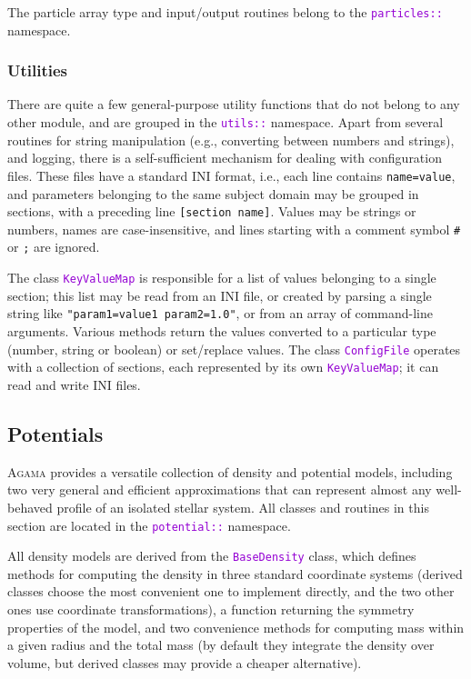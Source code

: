 \documentclass[12pt]{article}
\newcommand{\Agama}{\textsc{Agama}\xspace}
\newcommand{\ttt}[1]{\textcolor{darkviolet}{\texttt{#1}}}
\newcommand{\ppp}[1]{\textcolor{darkolive} {\texttt{#1}}}
\begin{document}
The particle array type and input/output routines belong to the \ttt{particles::} name\-space.

\subsubsection{Utilities}  \label{sec:Utilities}

There are quite a few general-purpose utility functions that do not belong to any other module, and are grouped in the \ttt{utils::} namespace. 
Apart from several routines for string manipulation (e.g., converting between numbers and strings), and logging, there is a self-sufficient mechanism for dealing with configuration files. These files have a standard INI format, i.e., each line contains \ppp{name=value}, and parameters belonging to the same subject domain may be grouped in sections, with a preceding line \ppp{[section name]}. Values may be strings or numbers, names are case-insensitive, and lines starting with a comment symbol \texttt{\#} or \texttt{;} are ignored.

The class \ttt{KeyValueMap} is responsible for a list of values belonging to a single section; this list may be read from an INI file, or created by parsing a single string like \ppp{"param1=value1 param2=1.0"}, or from an array of command-line arguments. Various methods return the values converted to a particular type (number, string or boolean) or set/replace values.
The class \ttt{ConfigFile} operates with a collection of sections, each represented by its own \ttt{KeyValueMap}; it can read and write INI files.


\subsection{Potentials}  \label{sec:Potential}

\Agama provides a versatile collection of density and potential models, including two very general and efficient approximations that can represent almost any well-behaved profile of an isolated stellar system. All classes and routines in this section are located in the \ttt{potential::} namespace.

All density models are derived from the \ttt{BaseDensity} class, which defines methods for computing the density in three standard coordinate systems (derived classes choose the most convenient one to implement directly, and the two other ones use coordinate transformations), a function returning the symmetry properties of the model, and two convenience methods for computing mass within a given radius and the total mass (by default they integrate the density over volume, but derived classes may provide a cheaper alternative).
\end{document}
